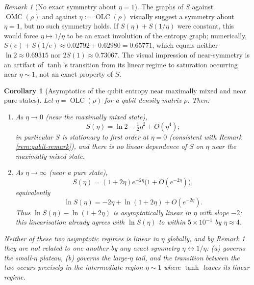 \documentclass{article}
\newtheorem{corollary}[theorem]{Corollary}
\theoremstyle{remark}
\newtheorem{remark}[theorem]{Remark}
\providecommand{\QLC}{\operatorname{OLC}}
\providecommand{\QMC}{\operatorname{OMC}}
\begin{document}
\begin{remark}[No exact symmetry about $\eta=1$]\label{rem:no-symmetry}
The graphs of $S$ against $\QMC(\rho)$ and against $\eta:=\QLC(\rho)$ visually suggest a symmetry about $\eta=1$, but no such symmetry holds. If $S(\eta)+S(1/\eta)$ were constant, this would force $\eta\mapsto1/\eta$ to be an exact involution of the entropy graph; numerically, $S(e)+S(1/e)\approx0.02792+0.62980=0.65771$, which equals neither $\ln2\approx0.69315$ nor $2S(1)\approx0.73067$. The visual impression of near-symmetry is an artifact of $\tanh$'s transition from its linear regime to saturation occurring near $\eta\sim1$, not an exact property of $S$.
\end{remark}

\begin{corollary}[Asymptotics of the qubit entropy near maximally mixed and near pure states]\label{cor:entropy-asymp}
Let $\eta=\QLC(\rho)$ for a qubit density matrix $\rho$. Then:
\begin{enumerate}[label=(\alph*)]
\item As $\eta\to0$ (near the maximally mixed state),
\[
S(\eta) = \ln2 - \tfrac12\eta^2 + O(\eta^4);
\]
in particular $S$ is stationary to first order at $\eta=0$ (consistent with Remark \ref{rem:qubit-remark}), and there is no linear dependence of $S$ on $\eta$ near the maximally mixed state.
\item As $\eta\to\infty$ (near a pure state),
\[
S(\eta) = (1+2\eta)e^{-2\eta}\big(1+O(e^{-2\eta})\big),
\]
equivalently
\[
\ln S(\eta) = -2\eta + \ln(1+2\eta) + O(e^{-2\eta}).
\]
Thus $\ln S(\eta)-\ln(1+2\eta)$ is asymptotically linear in $\eta$ with slope $-2$; this linearisation already agrees with $\ln S(\eta)$ to within $5\times10^{-4}$ by $\eta\approx4$.
\end{enumerate}
Neither of these two asymptotic regimes is linear in $\eta$ globally, and by Remark \ref{rem:no-symmetry} they are not related to one another by any exact symmetry $\eta\leftrightarrow1/\eta$: (a) governs the small-$\eta$ plateau, (b) governs the large-$\eta$ tail, and the transition between the two occurs precisely in the intermediate region $\eta\sim1$ where $\tanh$ leaves its linear regime.
\end{corollary}
\end{document}

